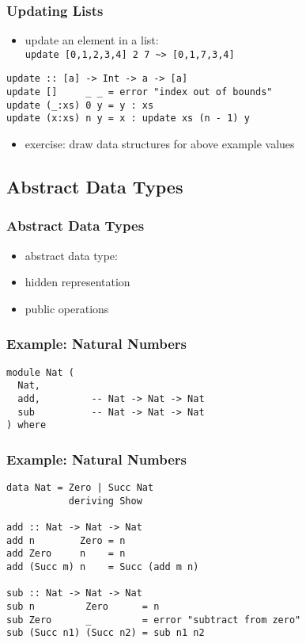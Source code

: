 \documentclass[dvipsnames]{beamer}
\theoremstyle{plain}
\begin{document}
\begin{frame}[fragile]
  \frametitle{Updating Lists}

  \begin{itemize}
    \item update an element in a list:\\
      \lstinline|update [0,1,2,3,4] 2 7 ~> [0,1,7,3,4]|
  \end{itemize}

  \begin{lstlisting}
update :: [a] -> Int -> a -> [a]
update []     _ _ = error "index out of bounds"
update (_:xs) 0 y = y : xs
update (x:xs) n y = x : update xs (n - 1) y
  \end{lstlisting}

  \begin{itemize}
    \item exercise: draw data structures for above example values
  \end{itemize}
\end{frame}

\subsection{Abstract Data Types}

\begin{frame}
  \frametitle{Abstract Data Types}

  \begin{itemize}
    \item \alert{abstract data type}:
    \smallskip
    \item hidden representation
    \item public operations
  \end{itemize}
\end{frame}

\begin{frame}[fragile]
  \frametitle{Example: Natural Numbers}

  \begin{lstlisting}
module Nat (
  Nat,
  add,         -- Nat -> Nat -> Nat
  sub          -- Nat -> Nat -> Nat
) where
  \end{lstlisting}
\end{frame}

\begin{frame}[fragile]
  \frametitle{Example: Natural Numbers}

  \begin{lstlisting}
data Nat = Zero | Succ Nat
           deriving Show

add :: Nat -> Nat -> Nat
add n        Zero = n
add Zero     n    = n
add (Succ m) n    = Succ (add m n)

sub :: Nat -> Nat -> Nat
sub n         Zero      = n
sub Zero      _         = error "subtract from zero"
sub (Succ n1) (Succ n2) = sub n1 n2
  \end{lstlisting}
\end{frame}
\end{document}
